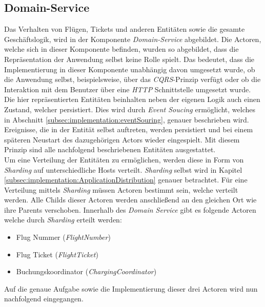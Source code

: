 \subsection{Domain-Service}
\label{subsec:implementation:domainService} 
Das Verhalten von Flügen, Tickets und anderen Entitäten sowie die gesamte Geschäftslogik, wird in der Komponente \textit{Domain-Service} abgebildet. Die Actoren, welche sich in dieser Komponente befinden, wurden so abgebildet, dass die Repräsentation der Anwendung selbst keine Rolle spielt. Das bedeutet, dass die Implementierung in dieser Komponente unabhängig davon umgesetzt wurde, ob die Anwendung selbst, beispielsweise, über das \textit{CQRS}-Prinzip verfügt oder ob die Interaktion mit dem Benutzer über eine \textit{HTTP} Schnittstelle umgesetzt wurde. \\
Die hier repräsentierten Entitäten beinhalten neben der eigenen Logik auch einen Zustand, welcher persistiert. Dies wird durch \textit{Event Soucing} ermöglicht, welches in Abschnitt \ref{subsec:implementation:eventSouring}, genauer beschrieben wird. Ereignisse, die in der Entität selbst auftreten, werden persistiert und bei einem späteren Neustart des dazugehörigen Actors wieder eingespielt. Mit diesem Prinzip sind alle nachfolgend beschriebenen Entitäten ausgestattet. \\
Um eine Verteilung der Entitäten zu ermöglichen, werden diese in Form von \textit{Sharding} auf unterschiedliche Hosts verteilt. \textit{Sharding} selbst wird in Kapitel \ref{subsec:implementation:ApplicationDistribution} genauer betrachtet. Für eine Verteilung mittels \textit{Sharding} müssen Actoren bestimmt sein, welche verteilt werden. Alle Childs dieser Actoren werden anschließend an den gleichen Ort wie ihre Parents verschoben. Innerhalb des \textit{Domain Service} gibt es folgende Actoren welche durch \textit{Sharding} erteilt werden:
\begin{itemize}
    \item Flug Nummer (\textit{FlightNumber})
    \item Flug Ticket (\textit{FlightTicket})
    \item Buchungskoordinator (\textit{ChargingCoordinator})
\end{itemize}
Auf die genaue Aufgabe sowie die Implementierung dieser drei Actoren wird nun nachfolgend eingegangen.

